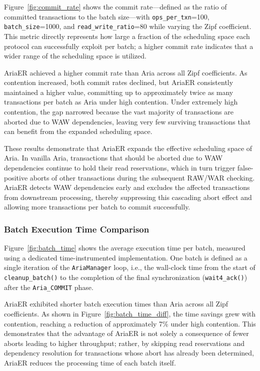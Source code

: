 \documentclass[english,preprint,JIP]{ipsj}
\begin{document}
Figure~\ref{fig:commit_rate} shows the commit rate---defined as the ratio of committed transactions to the batch size---with \texttt{ops\_per\_txn}=100, \texttt{batch\_size}=1000, and \texttt{read\_write\_ratio}=80 while varying the Zipf coefficient. This metric directly represents how large a fraction of the scheduling space each protocol can successfully exploit per batch; a higher commit rate indicates that a wider range of the scheduling space is utilized.

AriaER achieved a higher commit rate than Aria across all Zipf coefficients. As contention increased, both commit rates declined, but AriaER consistently maintained a higher value, committing up to approximately twice as many transactions per batch as Aria under high contention. Under extremely high contention, the gap narrowed because the vast majority of transactions are aborted due to WAW dependencies, leaving very few surviving transactions that can benefit from the expanded scheduling space.

These results demonstrate that AriaER expands the effective scheduling space of Aria. In vanilla Aria, transactions that should be aborted due to WAW dependencies continue to hold their read reservations, which in turn trigger false-positive aborts of other transactions during the subsequent RAW/WAR checking. AriaER detects WAW dependencies early and excludes the affected transactions from downstream processing, thereby suppressing this cascading abort effect and allowing more transactions per batch to commit successfully.

\subsubsection{Batch Execution Time Comparison}

Figure~\ref{fig:batch_time} shows the average execution time per batch, measured using a dedicated time-instrumented implementation. One batch is defined as a single iteration of the \texttt{AriaManager} loop, i.e., the wall-clock time from the start of \texttt{cleanup\_batch()} to the completion of the final synchronization (\texttt{wait4\_ack()}) after the \texttt{Aria\_COMMIT} phase.

AriaER exhibited shorter batch execution times than Aria across all Zipf coefficients. As shown in Figure~\ref{fig:batch_time_diff}, the time savings grew with contention, reaching a reduction of approximately 7\% under high contention. This demonstrates that the advantage of AriaER is not solely a consequence of fewer aborts leading to higher throughput; rather, by skipping read reservations and dependency resolution for transactions whose abort has already been determined, AriaER reduces the processing time of each batch itself.
\end{document}
